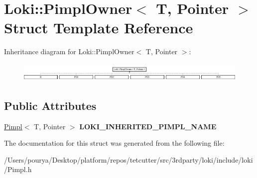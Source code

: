 \hypertarget{structLoki_1_1PimplOwner}{}\section{Loki\+:\+:Pimpl\+Owner$<$ T, Pointer $>$ Struct Template Reference}
\label{structLoki_1_1PimplOwner}
Inheritance diagram for Loki\+:\+:Pimpl\+Owner$<$ T, Pointer $>$\+:\begin{figure}[H]
\begin{center}
\leavevmode
\includegraphics[height=0.947547cm]{structLoki_1_1PimplOwner}
\end{center}
\end{figure}
\subsection*{Public Attributes}
\begin{DoxyCompactItemize}
\item 
\hypertarget{structLoki_1_1PimplOwner_aa45a4ff41644ae4bbd3db933c9c229ec}{}\hyperlink{classLoki_1_1Pimpl}{Pimpl}$<$ T, Pointer $>$ {\bfseries L\+O\+K\+I\+\_\+\+I\+N\+H\+E\+R\+I\+T\+E\+D\+\_\+\+P\+I\+M\+P\+L\+\_\+\+N\+A\+M\+E}\label{structLoki_1_1PimplOwner_aa45a4ff41644ae4bbd3db933c9c229ec}

\end{DoxyCompactItemize}


The documentation for this struct was generated from the following file\+:\begin{DoxyCompactItemize}
\item 
/\+Users/pourya/\+Desktop/platform/repos/tetcutter/src/3rdparty/loki/include/loki/Pimpl.\+h\end{DoxyCompactItemize}
